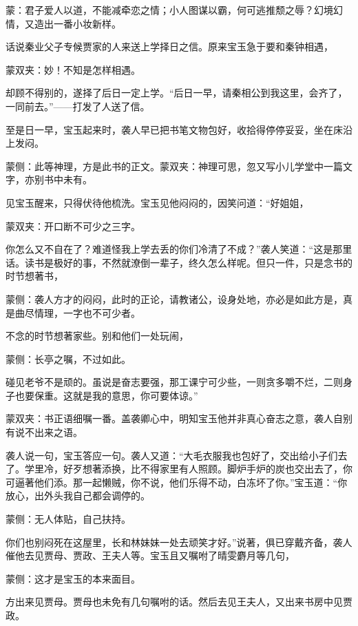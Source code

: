 
\begin{parag}
    \begin{note}蒙：君子爱人以道，不能减牵恋之情；小人图谋以霸，何可逃推颓之辱？幻境幻情，又造出一番小妆新样。\end{note}
\end{parag}


\begin{parag}
    话说秦业父子专候贾家的人来送上学择日之信。原来宝玉急于要和秦钟相遇，\begin{note}蒙双夹：妙！不知是怎样相遇。\end{note}却顾不得别的，遂择了后日一定上学。“后日一早，请秦相公到我这里，会齐了，一同前去。”——打发了人送了信。
\end{parag}


\begin{parag}
    至是日一早，宝玉起来时，袭人早已把书笔文物包好，收拾得停停妥妥，坐在床沿上发闷。\begin{note}蒙侧：此等神理，方是此书的正文。蒙双夹：神理可思，忽又写小儿学堂中一篇文字，亦别书中未有。\end{note}见宝玉醒来，只得伏待他梳洗。宝玉见他闷闷的，因笑问道：“好姐姐，\begin{note}蒙双夹：开口断不可少之三字。\end{note}你怎么又不自在了？难道怪我上学去丢的你们冷清了不成？”袭人笑道：“这是那里话。读书是极好的事，不然就潦倒一辈子，终久怎么样呢。但只一件，只是念书的时节想著书，\begin{note}蒙侧：袭人方才的闷闷，此时的正论，请教诸公，设身处地，亦必是如此方是，真是曲尽情理，一字也不可少者。\end{note}不念的时节想著家些。别和他们一处玩闹，\begin{note}蒙侧：长亭之嘱，不过如此。\end{note}碰见老爷不是顽的。虽说是奋志要强，那工课宁可少些，一则贪多嚼不烂，二则身子也要保重。这就是我的意思，你可要体谅。”\begin{note}蒙双夹：书正语细嘱一番。盖袭卿心中，明知宝玉他并非真心奋志之意，袭人自别有说不出来之语。\end{note}袭人说一句，宝玉答应一句。袭人又道：“大毛衣服我也包好了，交出给小子们去了。学里冷，好歹想著添换，比不得家里有人照顾。脚炉手炉的炭也交出去了，你可逼著他们添。那一起懒贼，你不说，他们乐得不动，白冻坏了你。”宝玉道：“你放心，出外头我自己都会调停的。\begin{note}蒙侧：无人体贴，自己扶持。\end{note}你们也别闷死在这屋里，长和林妹妹一处去顽笑才好。”说著，俱已穿戴齐备，袭人催他去见贾母、贾政、王夫人等。宝玉且又嘱咐了晴雯麝月等几句，\begin{note}蒙侧：这才是宝玉的本来面目。\end{note}方出来见贾母。贾母也未免有几句嘱咐的话。然后去见王夫人，又出来书房中见贾政。
\end{parag}


